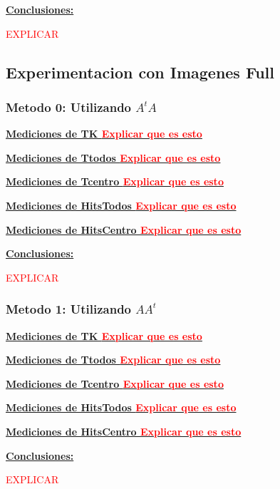 \underline{\textbf{Conclusiones:}}

\textcolor{red}{EXPLICAR}

\subsection{Experimentacion con Imagenes Full}

\subsubsection{Metodo 0: Utilizando $A^tA$}

\underline{\textbf{Mediciones de TK \textcolor{red}{Explicar que es esto}}}

\underline{\textbf{Mediciones de Ttodos \textcolor{red}{Explicar que es esto}}}

\underline{\textbf{Mediciones de Tcentro \textcolor{red}{Explicar que es esto}}}

\underline{\textbf{Mediciones de HitsTodos \textcolor{red}{Explicar que es esto}}}

\underline{\textbf{Mediciones de HitsCentro \textcolor{red}{Explicar que es esto}}}

\underline{\textbf{Conclusiones:}}

\textcolor{red}{EXPLICAR}

\subsubsection{Metodo 1: Utilizando $AA^t$}

\underline{\textbf{Mediciones de TK \textcolor{red}{Explicar que es esto}}}

\underline{\textbf{Mediciones de Ttodos \textcolor{red}{Explicar que es esto}}}

\underline{\textbf{Mediciones de Tcentro \textcolor{red}{Explicar que es esto}}}

\underline{\textbf{Mediciones de HitsTodos \textcolor{red}{Explicar que es esto}}}

\underline{\textbf{Mediciones de HitsCentro \textcolor{red}{Explicar que es esto}}}

\underline{\textbf{Conclusiones:}}

\textcolor{red}{EXPLICAR}
